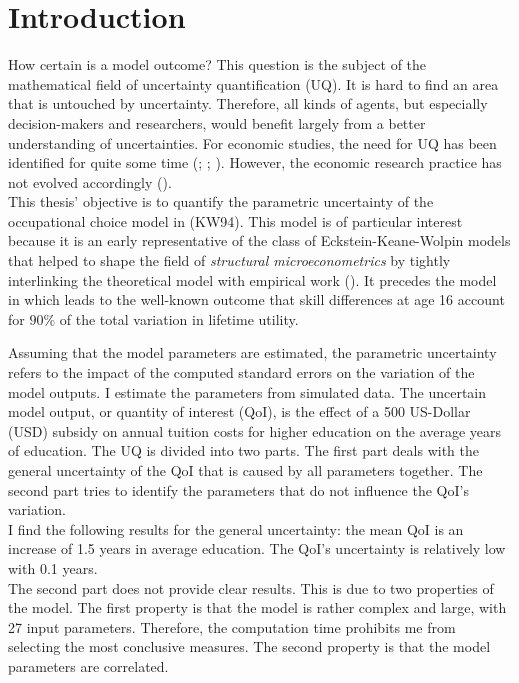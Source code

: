 \section{Introduction}
\thispagestyle{plain} %

How certain is a model outcome? This question is the subject of the mathematical field of uncertainty quantification (UQ). It is hard to find an area that is untouched by uncertainty. Therefore, all kinds of agents, but especially decision-makers and researchers, would benefit largely from a better understanding of uncertainties. For economic studies, the need for UQ  has been identified for quite some time (\cite{Hansen.1996}; \cite{Canova.1994}; \cite{Kydland.1992}). However, the economic research practice has not evolved accordingly (\cite{Harenberg.2019}).\\

\noindent
This thesis' objective is to quantify the parametric uncertainty of the occupational choice model in \cite{Keane.1994} (KW94). This model is of particular interest because it is an early representative of the class of Eckstein-Keane-Wolpin models that helped to shape the field of \textit{structural microeconometrics} by tightly interlinking the theoretical model with empirical work (\cite{Rust.2014}). It precedes the model in \cite{Keane.1997} which leads to the well-known outcome that skill differences at age 16 account for $90\%$ of the total variation in lifetime utility.

Assuming that the model parameters are estimated, the parametric uncertainty refers to the impact of the computed standard errors on the variation of the model outputs. I estimate the parameters from simulated data.
The uncertain model output, or quantity of interest (QoI), is the effect of a 500 US-Dollar (USD) subsidy on annual tuition costs for higher education on the average years of education. The UQ is divided into two parts. The first part deals with the general uncertainty of the QoI that is caused by all parameters together. The second part tries to identify the parameters that do not influence the QoI's variation.\\

\noindent
I find the following results for the general uncertainty: the mean QoI is an increase of 1.5 years in average education. The QoI's uncertainty is relatively low with 0.1 years.\\

\noindent
The second part does not provide clear results. This is due to two properties of the model.
The first property is that the model is rather complex and large, with 27 input parameters. Therefore, the computation time prohibits me from selecting the most conclusive measures.
The second property is that the model parameters are correlated.


